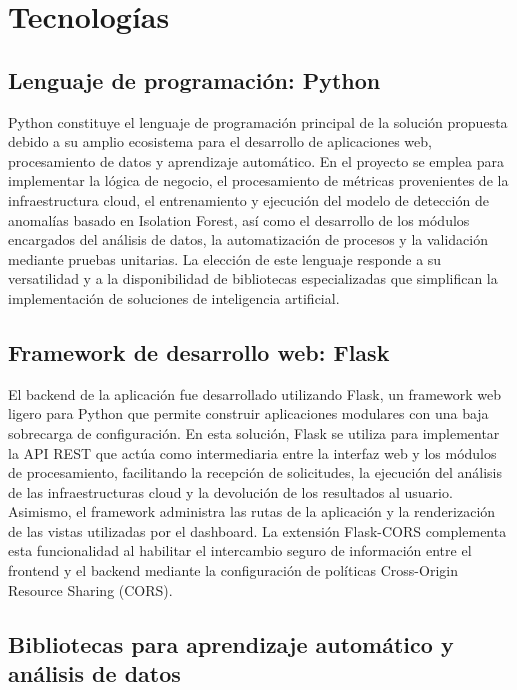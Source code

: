 \chapter{Tecnologías}

\section{Lenguaje de programación: Python}

Python constituye el lenguaje de programación principal de la solución
propuesta debido a su amplio ecosistema para el desarrollo de
aplicaciones web, procesamiento de datos y aprendizaje automático. En el
proyecto se emplea para implementar la lógica de negocio, el
procesamiento de métricas provenientes de la infraestructura cloud, el
entrenamiento y ejecución del modelo de detección de anomalías basado en
Isolation Forest, así como el desarrollo de los módulos encargados del
análisis de datos, la automatización de procesos y la validación
mediante pruebas unitarias. La elección de este lenguaje responde a su
versatilidad y a la disponibilidad de bibliotecas especializadas que
simplifican la implementación de soluciones de inteligencia artificial.

\section{Framework de desarrollo web: Flask}

El backend de la aplicación fue desarrollado utilizando Flask, un
framework web ligero para Python que permite construir aplicaciones
modulares con una baja sobrecarga de configuración. En esta solución,
Flask se utiliza para implementar la API REST que actúa como
intermediaria entre la interfaz web y los módulos de procesamiento,
facilitando la recepción de solicitudes, la ejecución del análisis de
las infraestructuras cloud y la devolución de los resultados al usuario.
Asimismo, el framework administra las rutas de la aplicación y la
renderización de las vistas utilizadas por el dashboard. La extensión
Flask-CORS complementa esta funcionalidad al habilitar el intercambio
seguro de información entre el frontend y el backend mediante la
configuración de políticas Cross-Origin Resource Sharing (CORS).

\section{Bibliotecas para aprendizaje automático y análisis de datos}


